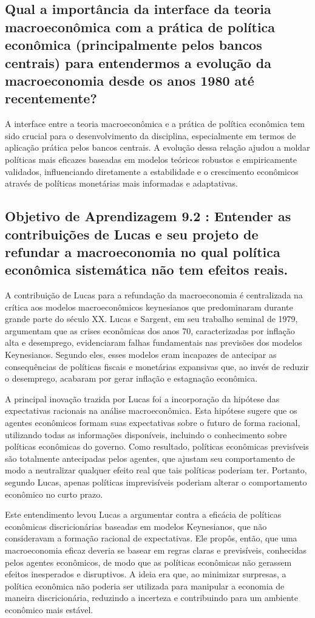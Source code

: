 \documentclass[a4paper,12pt]{article}[abntex2]
\begin{document}
\subsection{\textbf{Qual a importância da interface da teoria macroeconômica com a prática de política econômica (principalmente pelos bancos centrais) para entendermos a evolução da macroeconomia desde os anos 1980 até recentemente?}}
A interface entre a teoria macroeconômica e a prática de política econômica tem sido crucial para o desenvolvimento da disciplina, especialmente em termos de aplicação prática pelos bancos centrais. A evolução dessa relação ajudou a moldar políticas mais eficazes baseadas em modelos teóricos robustos e empiricamente validados, influenciando diretamente a estabilidade e o crescimento econômicos através de políticas monetárias mais informadas e adaptativas.


\subsection{\textbf{Objetivo de Aprendizagem 9.2 : Entender as contribuições de Lucas e seu projeto de refundar a macroeconomia no qual política econômica sistemática não tem efeitos reais.}}
A contribuição de Lucas para a refundação da macroeconomia é centralizada na crítica aos modelos macroeconômicos keynesianos que predominaram durante grande parte do século XX. Lucas e Sargent, em seu trabalho seminal de 1979, argumentam que as crises econômicas dos anos 70, caracterizadas por inflação alta e desemprego, evidenciaram falhas fundamentais nas previsões dos modelos Keynesianos. Segundo eles, esses modelos eram incapazes de antecipar as consequências de políticas fiscais e monetárias expansivas que, ao invés de reduzir o desemprego, acabaram por gerar inflação e estagnação econômica.

A principal inovação trazida por Lucas foi a incorporação da hipótese das expectativas racionais na análise macroeconômica. Esta hipótese sugere que os agentes econômicos formam suas expectativas sobre o futuro de forma racional, utilizando todas as informações disponíveis, incluindo o conhecimento sobre políticas econômicas do governo. Como resultado, políticas econômicas previsíveis são totalmente antecipadas pelos agentes, que ajustam seu comportamento de modo a neutralizar qualquer efeito real que tais políticas poderiam ter. Portanto, segundo Lucas, apenas políticas imprevisíveis poderiam alterar o comportamento econômico no curto prazo.

Este entendimento levou Lucas a argumentar contra a eficácia de políticas econômicas discricionárias baseadas em modelos Keynesianos, que não consideravam a formação racional de expectativas. Ele propôs, então, que uma macroeconomia eficaz deveria se basear em regras claras e previsíveis, conhecidas pelos agentes econômicos, de modo que as políticas econômicas não gerassem efeitos inesperados e disruptivos. A ideia era que, ao minimizar surpresas, a política econômica não poderia ser utilizada para manipular a economia de maneira discricionária, reduzindo a incerteza e contribuindo para um ambiente econômico mais estável.
\end{document}
